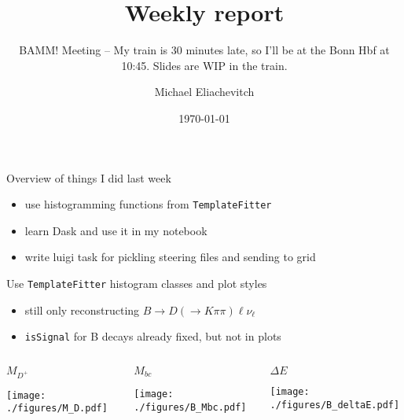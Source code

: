 \documentclass[aspectratio=169, 16pt]{beamer}
\author{Michael Eliachevitch}
\date{\today}
\title{Weekly report}
\subtitle{BAMM! Meeting -- My train is 30 minutes late, so I'll be at the Bonn Hbf at 10:45. Slides are WIP in the train.}
\institute{Physikalisches Institut --- Rheinische Friedrich-Wilhelms-Universität Bonn}
\begin{document}
\maketitle
\begin{frame}[label={sec:org3a79f7f},fragile]{Overview of things I did last week}
 \begin{itemize}
\item use histogramming functions from \texttt{TemplateFitter}
\item learn Dask and use it in my notebook
\item write luigi task for pickling steering files and sending to grid
\end{itemize}
\end{frame}

\begin{frame}[label={sec:org96999f6},fragile]{Use \texttt{TemplateFitter} histogram classes and plot styles}
 \begin{itemize}
\item still only reconstructing \(B \rightarrow D (\rightarrow K\pi\pi) \ell \nu_{\ell}\)
\item \texttt{isSignal} for B decays already fixed, but not in plots
\end{itemize}
\begin{columns}
\begin{column}{0.33\columnwidth}
\(M_{D^+}\)
\begin{center}
\texttt{[image: ./figures/M\_D.pdf]}
\end{center}
\end{column}
\begin{column}{0.33\columnwidth}
\(M_{bc}\)
\begin{center}
\texttt{[image: ./figures/B\_Mbc.pdf]}
\end{center}
\end{column}
\begin{column}{0.33\columnwidth}
\(\Delta E\)
\begin{center}
\texttt{[image: ./figures/B\_deltaE.pdf]}
\end{center}
\end{column}
\end{columns}
\end{frame}
\end{document}

